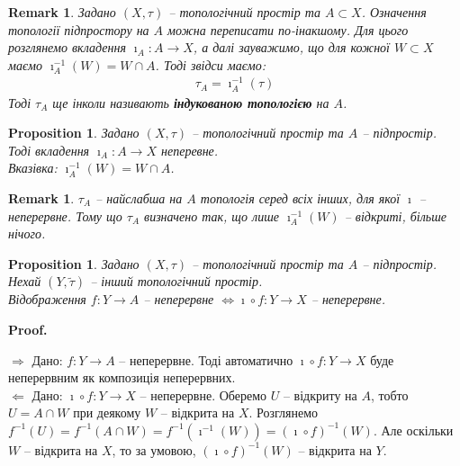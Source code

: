 \documentclass[a4paper, 10pt]{article}
\makeatletter
\def\rightproof{$\boxed{\Rightarrow}$ }
\def\leftproof{$\boxed{\Leftarrow}$ }
\theoremstyle{theoremdd}
\newtheorem{proposition}[theorem]{Proposition}
\newtheorem{remark}[theorem]{Remark}
\renewenvironment{proof}[1][Proof.\\]{\par
\pushQED{\hfill \qed}%
\normalfont \topsep6\p@\@plus6\p@\relax
\trivlist
\item\relax
{\bfseries
#1\@addpunct{.}}\hspace\labelsep\ignorespaces
}{%
\popQED\endtrivlist\@endpefalse
}
\makeatother
\begin{document}
\begin{remark}
Задано $(X,\tau)$ -- топологічний простір та $A \subset X$. Означення топології підпростору на $A$ можна переписати по-інакшому. Для цього розглянемо вкладення $\imath_A \colon A \to X$, а далі зауважимо, що для кожної $W \subset X$ маємо $\imath_A^{-1}(W) = W \cap A$. Тоді звідси маємо:
\begin{align*}
\tau_A = \imath^{-1}_A(\tau)
\end{align*}
Тоді $\tau_A$ ще інколи називають \textbf{індукованою топологією} на $A$.
\end{remark}

\begin{proposition}
Задано $(X,\tau)$ -- топологічний простір та $A$ -- підпростір. Тоді вкладення $\imath_A \colon A \to X$ неперевне.\\
\textit{Вказівка: $\imath_A^{-1}(W) = W \cap A$.}
\end{proposition}

\begin{remark}
$\tau_A$ -- найслабша на $A$ топологія серед всіх інших, для якої $\imath$ -- неперервне. Тому що $\tau_A$ визначено так, що лише $\imath_A^{-1}(W)$ -- відкриті, більше нічого.
\end{remark}

\begin{proposition}
\label{continuity_on_smaller_codomain_iff_continuity_on_bigger_codomain}
Задано $(X,\tau)$ -- топологічний простір та $A$ -- підпростір. Нехай $(Y,\tilde{\tau})$ -- інший топологічний простір.\\
Відображення $f \colon Y \to A$ -- неперервне $\iff \imath \circ f \colon Y \to X$ -- неперервне.
\begin{figure}[H]
\centering
{}
\end{figure}
\end{proposition}

\begin{proof}
\rightproof Дано: $f \colon Y \to A$ -- неперервне. Тоді автоматично $\imath \circ f \colon Y \to X$ буде неперервним як композиція неперервних.
\bigskip \\
\leftproof Дано: $\imath \circ f \colon Y \to X$ -- неперервне. Оберемо $U$ -- відкриту на $A$, тобто $U = A \cap W$ при деякому $W$ -- відкрита на $X$. Розглянемо $f^{-1}(U) = f^{-1}(A \cap W) = f^{-1}(\imath^{-1}(W)) = (\imath \circ f)^{-1}(W)$. Але оскільки $W$ -- відкрита на $X$, то за умовою, $(\imath \circ f)^{-1}(W)$ -- відкрита на $Y$.
\end{proof}
\end{document}
